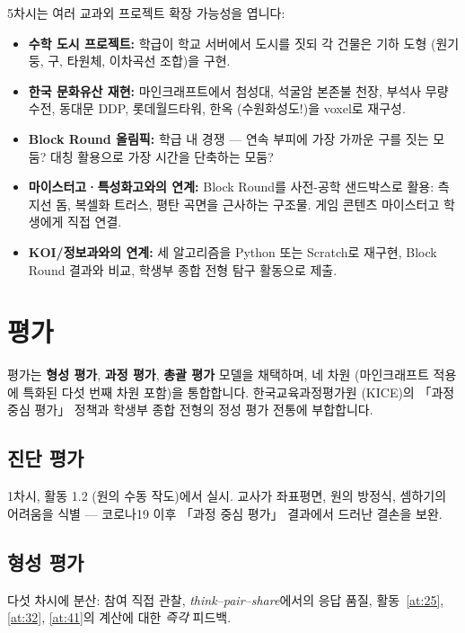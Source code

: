 \documentclass[12pt,a4paper]{scrartcl}
\newcommand{\acc}[1]{\textcolor{accent}{\textbf{#1}}}
\begin{document}
\begin{minecraft}[확장 가능성]
5차시는 여러 교과외 프로젝트 확장 가능성을 엽니다:
\begin{itemize}[leftmargin=1.3em,itemsep=0.15em,topsep=0.3em,nosep]
  \item \textbf{수학 도시 프로젝트:} 학급이 학교 서버에서 도시를 짓되 각 건물은 기하 도형 (원기둥, 구, 타원체, 이차곡선 조합)을 구현.
  \item \textbf{한국 문화유산 재현:} 마인크래프트에서 첨성대, 석굴암 본존불 천장, 부석사 무량수전, 동대문 DDP, 롯데월드타워, 한옥 (수원화성도!)을 voxel로 재구성.
  \item \textbf{Block Round 올림픽:} 학급 내 경쟁 --- 연속 부피에 가장 가까운 구를 짓는 모둠? 대칭 활용으로 가장 시간을 단축하는 모둠?
  \item \textbf{마이스터고·특성화고와의 연계:} Block Round를 사전-공학 샌드박스로 활용: 측지선 돔, 복셀화 트러스, 평탄 곡면을 근사하는 구조물. 게임 콘텐츠 마이스터고 학생에게 직접 연결.
  \item \textbf{KOI/정보과와의 연계:} 세 알고리즘을 Python 또는 Scratch로 재구현, Block Round 결과와 비교, 학생부 종합 전형 탐구 활동으로 제출.
\end{itemize}
\end{minecraft}

\section{평가}\label{sec:avaliacao}

평가는 \acc{형성 평가}, \acc{과정 평가}, \acc{총괄 평가} 모델을 채택하며, 네 차원 (마인크래프트 적용에 특화된 다섯 번째 차원 포함)을 통합합니다. 한국교육과정평가원 (KICE)의 「과정 중심 평가」 정책과 학생부 종합 전형의 정성 평가 전통에 부합합니다.

\subsection{진단 평가}
1차시, 활동 1.2 (원의 수동 작도)에서 실시. 교사가 좌표평면, 원의 방정식, 셈하기의 어려움을 식별 --- 코로나19 이후 「과정 중심 평가」 결과에서 드러난 결손을 보완.

\subsection{형성 평가}
다섯 차시에 분산: 참여 직접 관찰, \emph{think--pair--share}에서의 응답 품질, 활동~\ref{at:25}, \ref{at:32}, \ref{at:41}의 계산에 대한 \emph{즉각} 피드백.
\end{document}
